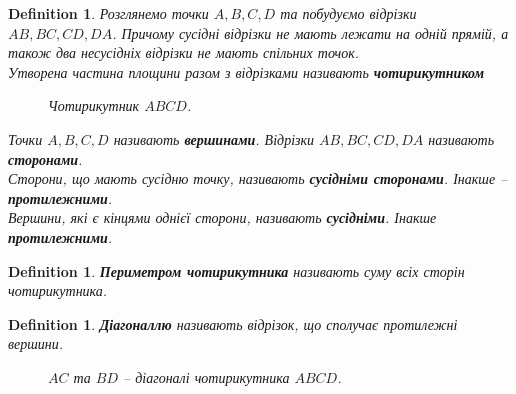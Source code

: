 \documentclass[a4paper, 10pt]{article}
\theoremstyle{theoremdd}
\theoremstyle{theoremdd}
\theoremstyle{theoremdd}
\newtheorem{definition}[theorem]{Definition}
\theoremstyle{theoremdd}
\theoremstyle{theoremdd}
\theoremstyle{theoremdd}
\theoremstyle{theoremdd}
\theoremstyle{theoremdd}
\theoremstyle{theoremdd}
\begin{document}
\begin{definition}
Розглянемо точки $A,B,C,D$ та побудуємо відрізки $AB,BC,CD,DA$. Причому сусідні відрізки не мають лежати на одній прямій, а також два несусідніх відрізки не мають спільних точок.\\
Утворена частина площини разом з відрізками називають \textbf{чотирикутником}
\begin{figure}[H]
\centering
{}
\caption*{Чотирикутник $ABCD$.}
\end{figure}
Точки $A,B,C,D$ називають \textbf{вершинами}. Відрізки $AB,BC,CD,DA$ називають \textbf{сторонами}.\\
Сторони, що мають сусідню точку, називають \textbf{сусідніми сторонами}. Інакше -- \textbf{протилежними}.\\
Вершини, які є кінцями однієї сторони, називають \textbf{сусідніми}. Інакше \textbf{протилежними}.
\end{definition}

\begin{definition}
\textbf{Периметром чотирикутника} називають суму всіх сторін чотирикутника.
\end{definition}

\begin{definition}
\textbf{Діагоналлю} називають відрізок, що сполучає протилежні вершини.
\begin{figure}[H]
\centering
{}
\caption*{$AC$ та $BD$ -- діагоналі чотирикутника $ABCD$.}
\end{figure}
\end{definition}
\end{document}

